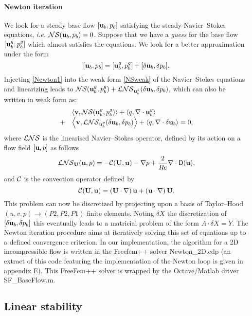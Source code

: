 \documentclass[twocolumn,10pt]{asme2ej}
\newcommand{\be}[1]{ \begin{equation} \label{#1}}
\newcommand{\ee}{\end{equation}}
\newcommand{\bes}[1]{ \begin{equation} \label{#1}\begin{array}{rl}}
\newcommand{\ees}{\end{array}\end{equation}}
\begin{document}
\paragraph{Newton iteration}


We look for a steady base-flow $[{\bf u}_b,p_b]$ satisfying the steady Navier--Stokes equations, \textit{i.e.} 
${\cal NS} ({\bf u}_b,p_b) = 0$.
Suppose that we have a {\em guess}  for the base flow $[{\bf u}_b^g,p_b^g]$  which almost satisfies the equations. 
We look for a better approximation under the form
\be{Newton1}
[{\bf u}_b,p_b]  = [{\bf u}_b^g,p_b^g] + [\delta {\bf u}_b, \delta p_b].
\ee
Injecting \eqref{Newton1} into the weak form \eqref{NSweak} of the Navier--Stokes equations and linearizing leads to  
${\cal NS}  ({\bf u}_b^g,p_b^g) +  {\cal LNS} _{{\bf u}_b^g}(\delta {\bf u}_b,\delta p_b)$, which can also be written in weak form as:
\bes{Newton2}
&\left< {\bf v}, {\cal NS} ({\bf u}_b^g,p_b^g)\right> + \left<q, \nabla \cdot {\bf u}_b^g\right>  
\\
+ &\left< { \bf v}, {\cal LNS} _{{\bf u}_b^g}( \delta {\bf u}_b,\delta p_b) \right> + \left<q, \nabla \cdot \delta{\bf u}_b\right> = 0,
\ees
where ${\cal LNS}$ is the linearised Navier--Stokes operator, defined by its action on a flow field $[{\bf u} , p]$ as follows 
\be{defNSL}
 {\cal LNS}_{{\bf U}}( {\bf u}, p) = - {\cal C}( {\bf U} , {\bf u}) -\nabla p
+\frac{2}{Re} \nabla  \cdot {\mathsf{D}}({\bf u}), %
 \ee
and ${\cal C}$ is the convection operator defined by 
\be{defC}
{\cal C}( {\bf U} , {\bf u}) = \left( {\bf U} \cdot \nabla \right) {\bf u} + \left( {\bf u} \cdot \nabla \right)  {\bf U}.
\ee
This problem can now be discretized by projecting upon a basis of Taylor--Hood $(u,v,p) \rightarrow (P2,P2,P1)$ finite elements. Noting $\delta X$ the discretization of $[\delta {\bf u}_b,\delta p_b]$ this eventually leads to a matricial problem of the form $A \cdot \delta X = Y$. The Newton iteration procedure aims at iteratively solving this set of equations up to a defined convergence criterion.
In our implementation, the algorithm for a 2D incompressible flow is written in the Freefem++ solver {\sf Newton\_2D.edp} (an extract of this code featuring the implementation of the Newton loop is given in appendix E). This FreeFem++ solver is wrapped by the Octave/Matlab driver {\sf SF\_BaseFlow.m}.

\subsection{Linear stability}
\vspace{.2cm}
\end{document}
